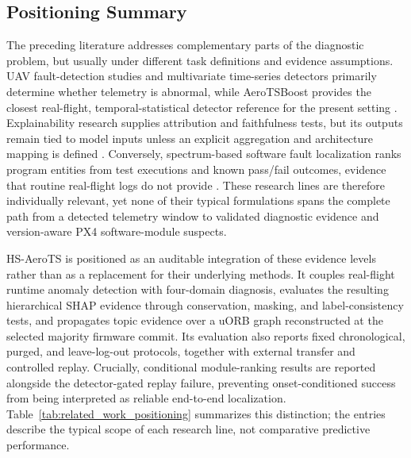 \subsection{Positioning Summary}

The preceding literature addresses complementary parts of the diagnostic problem, but usually under different task definitions and evidence assumptions. UAV fault-detection studies and multivariate time-series detectors primarily determine whether telemetry is abnormal, while AeroTSBoost provides the closest real-flight, temporal-statistical detector reference for the present setting \cite{keipour2019automatic,wei2026aerotsboost}. Explainability research supplies attribution and faithfulness tests, but its outputs remain tied to model inputs unless an explicit aggregation and architecture mapping is defined \cite{lundberg2020trees,hooker2019benchmark}. Conversely, spectrum-based software fault localization ranks program entities from test executions and known pass/fail outcomes, evidence that routine real-flight logs do not provide \cite{wong2016survey}. These research lines are therefore individually relevant, yet none of their typical formulations spans the complete path from a detected telemetry window to validated diagnostic evidence and version-aware PX4 software-module suspects.

HS-AeroTS is positioned as an auditable integration of these evidence levels rather than as a replacement for their underlying methods. It couples real-flight runtime anomaly detection with four-domain diagnosis, evaluates the resulting hierarchical SHAP evidence through conservation, masking, and label-consistency tests, and propagates topic evidence over a uORB graph reconstructed at the selected majority firmware commit. Its evaluation also reports fixed chronological, purged, and leave-log-out protocols, together with external transfer and controlled replay. Crucially, conditional module-ranking results are reported alongside the detector-gated replay failure, preventing onset-conditioned success from being interpreted as reliable end-to-end localization. Table~\ref{tab:related_work_positioning} summarizes this distinction; the entries describe the typical scope of each research line, not comparative predictive performance.

